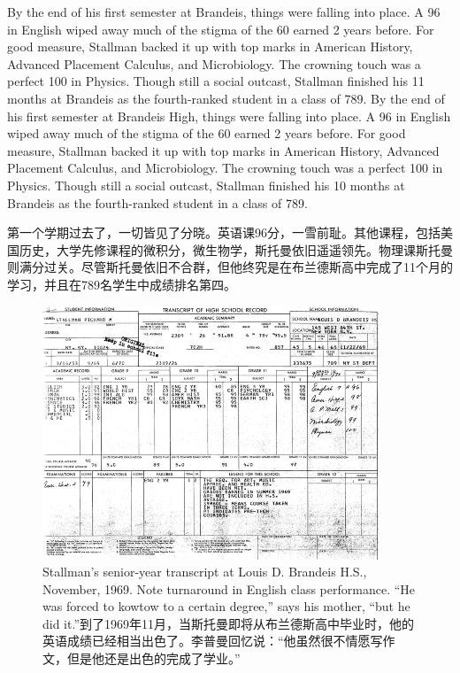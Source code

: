 \ifdefined\eng
\ifdefined\vone
By the end of his first semester at Brandeis, things were falling into place. A 96 in English wiped away much of the stigma of the 60 earned 2 years before. For good measure, Stallman backed it up with top marks in American History, Advanced Placement Calculus, and Microbiology. The crowning touch was a perfect 100 in Physics. Though still a social outcast, Stallman finished his 11 months at Brandeis as the fourth-ranked student in a class of 789.
\fi
\ifdefined\vtwo
By the end of his first semester at Brandeis High, things were falling into place. A 96 in English wiped away much of the stigma of the 60 earned 2 years before. For good measure, Stallman backed it up with top marks in American History, Advanced Placement Calculus, and Microbiology. The crowning touch was a perfect 100 in Physics. Though still a social outcast, Stallman finished his 10 months at Brandeis as the fourth-ranked student in a class of 789.
\fi
\fi

\ifdefined\chs
第一个学期过去了，一切皆见了分晓。英语课96分，一雪前耻。其他课程，包括美国历史，大学先修课程的微积分，微生物学，斯托曼依旧遥遥领先。物理课斯托曼则满分过关。尽管斯托曼依旧不合群，但他终究是在布兰德斯高中完成了11个月的学习，并且在789名学生中成绩排名第四。
\fi

\ifdefined\vone
\begin{figure}[ht] \centering
  \includegraphics[width=\textwidth]{transcript}
  \caption{\ifdefined\eng Stallman's senior-year transcript at Louis D. Brandeis H.S., November, 1969. Note turnaround in English class performance. ``He was forced to kowtow to a certain degree,'' says his mother, ``but he did it.''\fi\ifdefined\chs 到了1969年11月，当斯托曼即将从布兰德斯高中毕业时，他的英语成绩已经相当出色了。李普曼回忆说：``他虽然很不情愿写作文，但是他还是出色的完成了学业。''\fi}
\end{figure}
\fi

